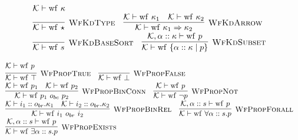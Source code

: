 \documentclass[fleqn]{article}
\begin{document}
\[
\begin{array}{l}
    \mathcal{K} \vdash \mathrm{wf}~\kappa \\
    \infer[\textsc{WfKdType}]{\mathcal{K} \vdash \mathrm{wf}~\star}{} \hspace{1em}
    \infer[\textsc{WfKdArrow}]{\mathcal{K} \vdash \mathrm{wf}~\kappa_1 \Rightarrow \kappa_2}{\mathcal{K} \vdash \mathrm{wf}~\kappa_1 & \mathcal{K} \vdash \mathrm{wf}~\kappa_2} \\
    \infer[\textsc{WfKdBaseSort}]{\mathcal{K} \vdash \mathrm{wf}~s}{} \hspace{1em}
    \infer[\textsc{WfKdSubset}]{\mathcal{K} \vdash \mathrm{wf}~\{ \alpha :: \kappa \mid p \}}{\mathcal{K},\alpha :: \kappa \vdash \mathrm{wf}~p}
\end{array}
\]

\[
\begin{array}{l}
    \mathcal{K} \vdash \mathrm{wf}~p \\
    \infer[\textsc{WfPropTrue}]{\mathcal{K} \vdash \mathrm{wf}~\top}{} \hspace{1em}
    \infer[\textsc{WfPropFalse}]{\mathcal{K} \vdash \mathrm{wf}~\bot}{} \\
    \infer[\textsc{WfPropBinConn}]{\mathcal{K} \vdash \mathrm{wf}~p_1~o_{bc}~p_2}{\mathcal{K} \vdash \mathrm{wf}~p_1 & \mathcal{K} \vdash \mathrm{wf}~p_2} \hspace{1em}
    \infer[\textsc{WfPropNot}]{\mathcal{K} \vdash \mathrm{wf}~\neg p}{\mathcal{K} \vdash \mathrm{wf}~p} \hspace{1em} \\
    \infer[\textsc{WfPropBinRel}]{\mathcal{K} \vdash \mathrm{wf}~i_1~o_{br}~i_2}{\mathcal{K} \vdash i_1 :: o_{br}.\kappa_1 & \mathcal{K} \vdash i_2 :: o_{br}.\kappa_2} \hspace{1em}
    \infer[\textsc{WfPropForall}]{\mathcal{K} \vdash \mathrm{wf}~\forall \alpha :: s. p}{\mathcal{K},\alpha :: s \vdash \mathrm{wf}~p} \\
    \infer[\textsc{WfPropExists}]{\mathcal{K} \vdash \mathrm{wf}~\exists \alpha :: s. p}{\mathcal{K},\alpha :: s \vdash \mathrm{wf}~p}
\end{array}
\]
\end{document}
